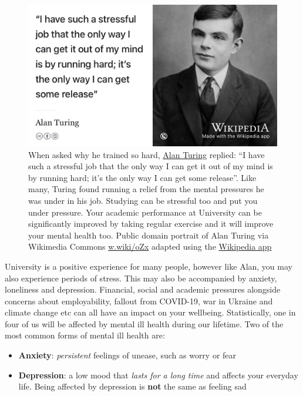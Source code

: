 \documentclass[
]{book}
\providecommand{\tightlist}{%
  \setlength{\itemsep}{0pt}\setlength{\parskip}{0pt}}
\begin{document}
\begin{figure}

{\centering \includegraphics[width=0.99\linewidth]{images/turunning-machine} 

}

\caption{When asked why he trained so hard, \href{https://en.wikipedia.org/wiki/Alan_Turing}{Alan Turing} replied: ``I have such a stressful job that the only way I can get it out of my mind is by running hard; it's the only way I can get some release''. Like many, Turing found running a relief from the mental pressures he was under in his job. \citep{kottke} Studying can be stressful too and put you under pressure. Your academic performance at University can be significantly improved by taking regular exercise and it will improve your mental health too. Public domain portrait of Alan Turing via Wikimedia Commons \href{https://w.wiki/oZx}{w.wiki/oZx} adapted using the \href{https://apps.apple.com/gb/app/wikipedia/id324715238}{Wikipedia app}}\label{fig:turing-stress-fig}
\end{figure}



University is a positive experience for many people, however like Alan, you may also experience periods of stress. This may also be accompanied by anxiety, loneliness and depression. Financial, social and academic pressures alongside concerns about employability, fallout from COVID-19, war in Ukraine and climate change etc can all have an impact on your wellbeing. Statistically, one in four of us will be affected by mental ill health during our lifetime. Two of the most common forms of mental ill health are:

\begin{itemize}
\tightlist
\item
  \textbf{Anxiety}: \emph{persistent} feelings of unease, such as worry or fear
\item
  \textbf{Depression}: a low mood that \emph{lasts for a long time} and affects your everyday life. Being affected by depression is \textbf{not} the same as feeling sad
\end{itemize}
\end{document}
